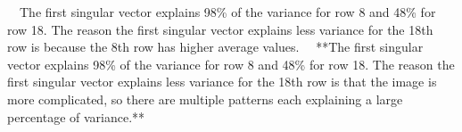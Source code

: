 ~~The first singular vector explains 98\% of the variance for row 8 and 48\% for row 18. 
The reason the first singular vector explains less variance for the 18th row is because the 8th row has higher average values.~~
**The first singular vector explains 98\% of the variance for row 8 and 48\% for row 18. 
The reason the first singular vector explains less variance for the 18th row is that the image is more complicated, so there are multiple patterns each explaining a large percentage of variance.**
